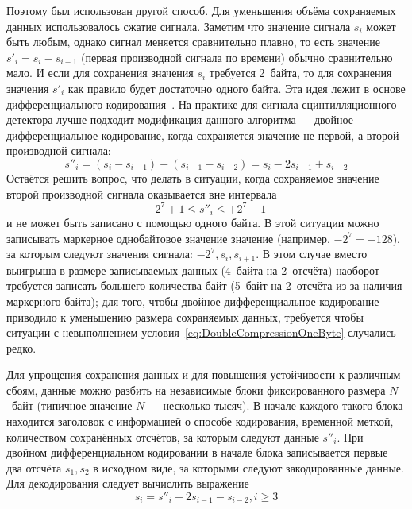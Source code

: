 Поэтому был использован другой способ. Для уменьшения объёма сохраняемых данных использовалось сжатие сигнала. Заметим что значение сигнала $s_i$ может быть любым, однако сигнал меняется сравнительно плавно, то есть значение $s'_i = s_i - s_{i-1}$ (первая производной сигнала по времени) обычно сравнительно мало. И если для сохранения значения $s_i$ требуется 2~байта, то для сохранения значения $s'_i$ как правило будет достаточно одного байта. Эта идея лежит в основе дифференциального кодирования~\cite{Sayood2012}. На практике для сигнала сцинтилляционного детектора лучше подходит модификация данного алгоритма --- двойное дифференциальное кодирование, когда сохраняется значение не первой, а второй производной сигнала:
\begin{equation*}
  s''_i = (s_i - s_{i-1}) - (s_{i-1} - s_{i-2}) = s_i - 2 s_{i-1} + s_{i-2}
\end{equation*}
Остаётся решить вопрос, что делать в ситуации, когда сохраняемое значение второй производной сигнала оказывается вне интервала 
\begin{equation}
  \label{eq:DoubleCompressionOneByte}
  -2^{7}+1 \le s''_i \le +2^7-1 
\end{equation}
и не может быть записано с помощью одного байта. В этой ситуации можно записывать маркерное однобайтовое значение значение (например, $-2^7 = -128$), за которым следуют значения сигнала: $ -2^7, s_i, s_{i+1} $. В этом случае вместо выигрыша в размере записываемых данных (4~байта на 2~отсчёта) наоборот требуется записать большего количества байт (5~байт на 2~отсчёта из-за наличия маркерного байта); для того, чтобы двойное дифференциальное кодирование приводило к уменьшению размера сохраняемых данных, требуется чтобы ситуации с невыполнением условия~\ref{eq:DoubleCompressionOneByte} случались редко.~\cite{Khilkevich2019Dvp}

Для упрощения сохранения данных и для повышения устойчивости к различным сбоям, данные можно разбить на независимые блоки фиксированного размера $N$~байт (типичное значение $N$ --- несколько тысяч). В начале каждого такого блока находится заголовок с информацией о способе кодирования, временной меткой, количеством сохранённых отсчётов, за которым следуют данные $s''_i$. При двойном дифференциальном кодировании в начале блока записывается первые два отсчёта $s_1, s_2$ в исходном виде, за которыми следуют закодированные данные. Для декодирования следует вычислить выражение~\cite{Khilkevich2019Dvp,Shevelev2021}
\begin{equation*}
  s_i = s''_i + 2 s_{i-1} - s_{i-2}, i \ge 3
\end{equation*}

